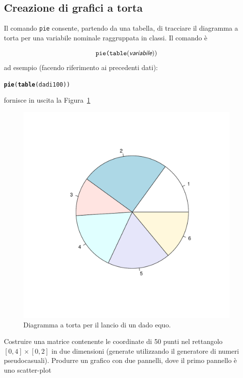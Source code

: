 \documentclass[onecolumn,12pt]{book}\usepackage[]{graphicx}\usepackage[]{color}
\makeatletter
\def\maxwidth{ %
  \ifdim\Gin@nat@width>\linewidth
    \linewidth
  \else
    \Gin@nat@width
  \fi
}
\newcommand{\hlstd}[1]{\textcolor[rgb]{0.345,0.345,0.345}{#1}}%
\newcommand{\hlkwd}[1]{\textcolor[rgb]{0.737,0.353,0.396}{\textbf{#1}}}%
\newenvironment{kframe}{%
 \def\at@end@of@kframe{}%
 \ifinner\ifhmode%
  \def\at@end@of@kframe{\end{minipage}}%
  \begin{minipage}{\columnwidth}%
 \fi\fi%
 \def\FrameCommand##1{\hskip\@totalleftmargin \hskip-\fboxsep
 \colorbox{shadecolor}{##1}\hskip-\fboxsep
     \hskip-\linewidth \hskip-\@totalleftmargin \hskip\columnwidth}%
 \MakeFramed {\advance\hsize-\width
   \@totalleftmargin\z@ \linewidth\hsize
   \@setminipage}}%
 {\par\unskip\endMakeFramed%
 \at@end@of@kframe}
\newenvironment{knitrout}{}{} %
\newcommand{\varia}[1]{\textsl{\textsf{#1}}}
\makeatother
\begin{document}
\subsection{Creazione di grafici a torta}

Il comando \texttt{pie} consente, partendo da una tabella, di tracciare il diagramma a torta per una variabile nominale raggruppata in classi. Il comando \`e

\begin{equation*}\texttt{pie(table}(\varia{variabile} ))
\end{equation*}
ad esempio (facendo riferimento ai precedenti dati):
\begin{knitrout}
\color{fgcolor}\begin{kframe}
\begin{alltt}
\hlkwd{pie}\hlstd{(}\hlkwd{table}\hlstd{(dadi100))}
\end{alltt}
\end{kframe}
\end{knitrout}
fornisce in uscita  la Figura~\ref{fig:pie}
\begin{figure}[htbp]
\begin{center}
\begin{knitrout}
\color{fgcolor}
\includegraphics[width=\maxwidth]{figure/unnamed-chunk-112-1} 

\end{knitrout}
\caption{Diagramma a torta per il lancio di un dado equo.}
\label{fig:pie}
\end{center}
\end{figure}
\begin{shaded}{Costruire una matrice contenente le coordinate di 50 punti nel rettangolo $[0,4]\times [0,2]$ in due dimensioni (generate utilizzando il generatore di numeri pseudocasuali). Produrre un grafico con due pannelli, dove il primo pannello \`e uno scatter-plot}
\end{shaded}
\end{document}
